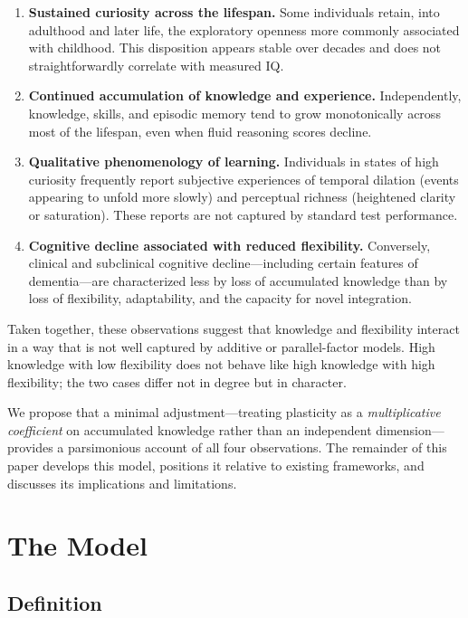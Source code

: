 \documentclass[11pt, a4paper]{article}
\begin{document}
\begin{enumerate}
    \item \textbf{Sustained curiosity across the lifespan.} Some individuals retain, into adulthood and later life, the exploratory openness more commonly associated with childhood. This disposition appears stable over decades and does not straightforwardly correlate with measured IQ.
    \item \textbf{Continued accumulation of knowledge and experience.} Independently, knowledge, skills, and episodic memory tend to grow monotonically across most of the lifespan, even when fluid reasoning scores decline.
    \item \textbf{Qualitative phenomenology of learning.} Individuals in states of high curiosity frequently report subjective experiences of temporal dilation (events appearing to unfold more slowly) and perceptual richness (heightened clarity or saturation). These reports are not captured by standard test performance.
    \item \textbf{Cognitive decline associated with reduced flexibility.} Conversely, clinical and subclinical cognitive decline---including certain features of dementia---are characterized less by loss of accumulated knowledge than by loss of flexibility, adaptability, and the capacity for novel integration.
\end{enumerate}

Taken together, these observations suggest that knowledge and flexibility interact in a way that is not well captured by additive or parallel-factor models. High knowledge with low flexibility does not behave like high knowledge with high flexibility; the two cases differ not in degree but in character.

We propose that a minimal adjustment---treating plasticity as a \emph{multiplicative coefficient} on accumulated knowledge rather than an independent dimension---provides a parsimonious account of all four observations. The remainder of this paper develops this model, positions it relative to existing frameworks, and discusses its implications and limitations.

\section{The Model}

\subsection{Definition}
\end{document}
